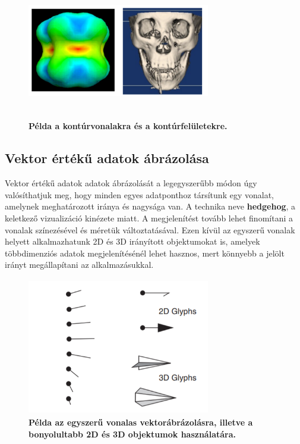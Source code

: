 \documentclass[12pt]{article}
\theoremstyle{plain}
\begin{document}
 \begin{figure}[H]
    \centering
    \includegraphics[width=8cm, height=6cm]{media/iso.PNG}
    \caption{\textbf{Példa a kontúrvonalakra és a kontúrfelületekre.}}
    \label{fig:GeneralDiagram}
 \end{figure}
 
 \subsection{Vektor értékű adatok ábrázolása}
 Vektor értékű adatok adatok ábrázolását a legegyszerűbb módon úgy valósíthatjuk meg, hogy minden egyes adatponthoz társítunk egy vonalat, amelynek meghatározott iránya és nagysága van. A technika neve \textbf{hedgehog}, a keletkező vizualizáció kinézete miatt. A megjelenítést tovább lehet finomítani a vonalak színezésével és méretük változtatásával. Ezen kívül az egyszerű vonalak helyett alkalmazhatunk 2D és 3D irányított objektumokat is, amelyek többdimenziós adatok megjelenítésénél lehet hasznos, mert könnyebb a jelölt irányt megállapítani az alkalmazásukkal.
 
 \begin{figure}[H]
    \centering
    \includegraphics[width=8cm, height=6cm]{media/glyph.PNG}
    \caption{\textbf{Példa az egyszerű vonalas vektorábrázolásra, illetve a bonyolultabb 2D és 3D objektumok használatára.}}
    \label{fig:GeneralDiagram}
 \end{figure}
 
\end{document}
